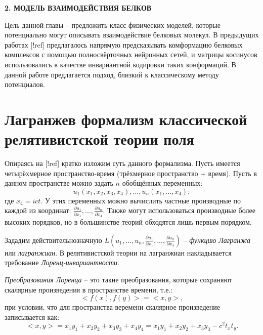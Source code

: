\newpage
\begin{center}
	\textbf{\large 2. МОДЕЛЬ ВЗАИМОДЕЙСТВИЯ БЕЛКОВ}
\end{center}
Цель данной главы -- предложить класс физических моделей, которые потенциально могут описывать взаимодействие белковых молекул.
В предыдущих работах [!ref] предлагалось напрямую предсказывать комформацию белковых комплексов с помощью полносвёрточных нейронных сетей,
и матрицы косинусов использовались в качестве инвариантной кодировки таких конформаций. В данной работе предлагается подход, близкий к классическому методу потенциалов.

\section{Лагранжев формализм классической релятивистской теории поля}
Опираясь на [!ref] кратко изложим суть данного формализма. Пусть имеется четырёхмерное пространство-время (трёхмерное пространство + время).
Пусть в данном пространстве можно задать $n$ обобщённых переменных:
\begin{equation}
	u_1(x_1, x_2, x_3, x_4), ..., u_n(x_1, ..., x_4);
	\label{generalized_variables}
\end{equation}
где $x_4 = ict$. У этих переменных можно вычислить
частные производные по каждой из координат: $\frac{\partial{u_1}}{\partial{x_1}}, ..., \frac{\partial{u_n}}{\partial{x_4}}$. Также могут использоваться производные
более высоких порядков, но в большинстве теорий обходятся лишь первым порядком.

Зададим действительнозначную $L(u_1, ..., u_n, \frac{\partial{u_1}}{\partial{x_1}}, ..., \frac{\partial{u_n}}{\partial{x_4}})$ -- \textit{функцию Лагранжа} или \textit{лагранжиан}.
В релятивистской теории на лагранжиан накладывается требование \textit{Лоренц-инвариантности}.

\textit{Преобразования Лоренца} -- это такие преобразования, которые сохраняют скалярные произведения в пространстве времени, т.е.:
\begin{equation}
	<f(x), f(y)> = <x, y>,
	\label{Lorenz_group}
\end{equation}
при условии, что для пространства-веремени скалярное произведение записывается как:
\begin{equation}
	<x, y> = x_1y_1 + x_2y_2 + x_3y_3 + x_4y_4 = x_1y_1 + x_2y_2 + x_3y_3 - c^2t_xt_y.
	\label{Minkowski_product}
\end{equation}

